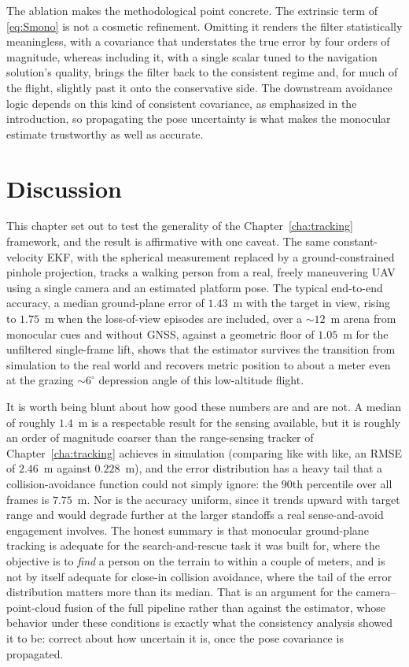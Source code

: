 The ablation makes the methodological point concrete. The extrinsic term of
\eqref{eq:Smono} is not a cosmetic refinement. Omitting it renders the filter
statistically meaningless, with a covariance that understates the true error by
four orders of magnitude, whereas including it, with a single scalar tuned to the
navigation solution's quality, brings the filter back to the consistent regime and,
for much of the flight, slightly past it onto the conservative side. The downstream avoidance
logic depends on this kind of consistent covariance, as emphasized in the
introduction, so propagating the pose uncertainty is what makes the monocular
estimate trustworthy as well as accurate.

\section{Discussion}
\label{sec:mono_discussion}

This chapter set out to test the generality of the
Chapter~\ref{cha:tracking} framework, and the result is affirmative with one
caveat. The same constant-velocity EKF, with the spherical measurement replaced
by a ground-constrained pinhole projection, tracks a walking person from a real,
freely maneuvering UAV using a single camera and an estimated platform pose. The
typical end-to-end accuracy, a median ground-plane error of $1.43$~m with the
target in view, rising to $1.75$~m when the loss-of-view episodes are
included, over a $\sim 12$~m arena from monocular cues and without GNSS, against a
geometric floor of $1.05$~m for the unfiltered single-frame lift, shows that the
estimator survives the transition from simulation to the real world and recovers
metric position to about a meter even at the grazing $\sim 6^\circ$ depression
angle of this low-altitude flight.

It is worth being blunt about how good these numbers are and are not. A median of
roughly $1.4$~m is a respectable result for the sensing available, but it is
roughly an order of magnitude coarser than the range-sensing tracker of
Chapter~\ref{cha:tracking} achieves in simulation (comparing like with like,
an RMSE of $2.46$~m against $0.228$~m), and the error distribution has
a heavy tail that a collision-avoidance function could not simply ignore: the
$90$th percentile over all frames is $7.75$~m. Nor is the accuracy uniform, since
it trends upward with target range and would degrade further at
the larger standoffs a real sense-and-avoid engagement involves. The honest
summary is that monocular ground-plane tracking is adequate for the
search-and-rescue task it was built for, where the objective is to \emph{find} a
person on the terrain to within a couple of meters, and is not by itself adequate
for close-in collision avoidance, where the tail of the error distribution matters
more than its median. That is an argument for the camera--point-cloud fusion of
the full pipeline rather than against the estimator, whose behavior under these
conditions is exactly what the consistency analysis showed it to be: correct about
how uncertain it is, once the pose covariance is propagated.


